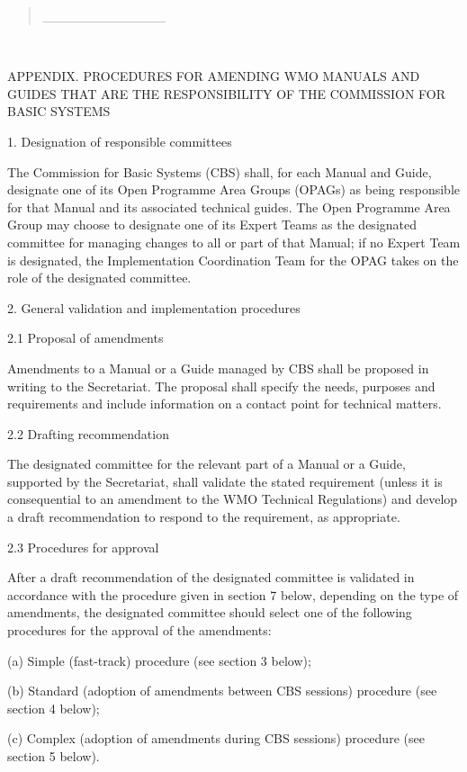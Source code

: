 \begin{quote}
\_\_\_\_\_\_\_\_\_\_\_\_\_
\end{quote}

\textbf{\\
}

APPENDIX. PROCEDURES FOR AMENDING WMO MANUALS AND GUIDES THAT ARE THE RESPONSIBILITY OF THE COMMISSION FOR BASIC SYSTEMS

1. Designation of responsible committees

The Commission for Basic Systems (CBS) shall, for each Manual and Guide, designate one of its Open Programme Area Groups (OPAGs) as being responsible for that Manual and its associated technical guides. The Open Programme Area Group may choose to designate one of its Expert Teams as the designated committee for managing changes to all or part of that Manual; if no Expert Team is designated, the Implementation Coordination Team for the OPAG takes on the role of the designated committee.

2. General validation and implementation procedures

2.1 Proposal of amendments

Amendments to a Manual or a Guide managed by CBS shall be proposed in writing to the Secretariat. The proposal shall specify the needs, purposes and requirements and include information on a contact point for technical matters.

2.2 Drafting recommendation

The designated committee for the relevant part of a Manual or a Guide, supported by the Secretariat, shall validate the stated requirement (unless it is consequential to an amendment to the WMO Technical Regulations) and develop a draft recommendation to respond to the requirement, as appropriate.

2.3 Procedures for approval

After a draft recommendation of the designated committee is validated in accordance with the procedure given in section 7 below, depending on the type of amendments, the designated committee should select one of the following procedures for the approval of the amendments:

(a) Simple (fast-track) procedure (see section 3 below);

(b) Standard (adoption of amendments between CBS sessions) procedure (see section 4 below);

(c) Complex (adoption of amendments during CBS sessions) procedure (see section 5 below).

